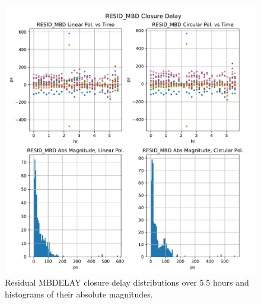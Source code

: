\documentclass[letterpaper,twoside,12pt]{article}
\begin{document}
\begin{figure}[ht!]
  \begin{center}
  \includegraphics[width=38pc]{RESID_MBD_Closure_Delay.pdf}
  \caption{\small Residual MBDELAY closure delay distributions over 5.5 hours and histograms of their absolute magnitudes.}
  \label{resid_mbd}
  \end{center}
\end{figure}
\end{document}
